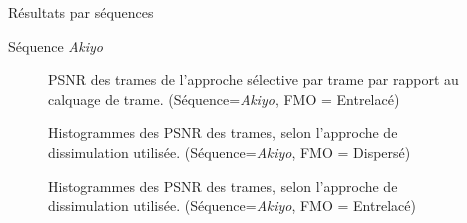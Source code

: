 \begin{section}{Résultats par séquences}
\begin{subsection}{Séquence \textit{Akiyo}}
\begin{figure}  \caption[]{PSNR des trames de l'approche sélective par trame par rapport au
calquage de trame. (Séquence=\textit{Akiyo}, FMO = Entrelacé)}
\label{fig-ParSequenceFrameInterleaved1}
\end{figure}

\begin{figure} 
\caption[]{Histogrammes des PSNR des trames, selon l'approche de dissimulation
utilisée. (Séquence=\textit{Akiyo}, FMO = Dispersé)}
\label{fig-ParSequenceDispersed1}
\end{figure}

\begin{figure} 
\caption[]{Histogrammes des PSNR des trames, selon l'approche de dissimulation
utilisée. (Séquence=\textit{Akiyo}, FMO = Entrelacé)}
\label{fig-ParSequenceInterleaved1}
\end{figure}


\end{subsection}
\end{section}
